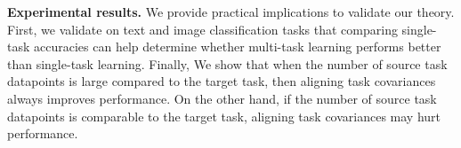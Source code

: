 




\textbf{Experimental results.} We provide practical implications to validate our theory.
	First, we validate on text and image classification tasks that comparing single-task accuracies can help determine whether multi-task learning performs better than single-task learning.
	Finally, We show that when the number of source task datapoints is large compared to the target task, then aligning task covariances always improves performance.
	On the other hand, if the number of source task datapoints is comparable to the target task, aligning task covariances may hurt performance.

